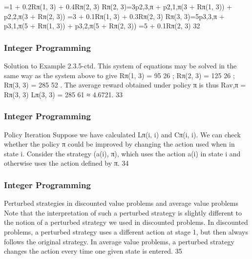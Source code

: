 \begin{frame}
=1 + 0.2Rπ(1, 3) + 0.4Rπ(2, 3)
Rπ(2, 3)=3p2,3,π + p2,1,π(3 + Rπ(1, 3)) + p2,2,π(3 + Rπ(2, 3))
=3 + 0.1Rπ(1, 3) + 0.3Rπ(2, 3)
Rπ(3, 3)=5p3,3,π + p3,1,π(5 + Rπ(1, 3)) + p3,2,π(5 + Rπ(2, 3))
=5 + 0.1Rπ(2, 3)
32 \end{frame}  \begin{frame} \frametitle{Integer Programming}     
Solution to Example 2.3.5-ctd.
This system of equations may be solved in the same way as the
system above to give
Rπ(1, 3) = 95
26
; Rπ(2, 3) = 125
26
; Rπ(3, 3) = 285
52
.
The average reward obtained under policy π is thus
Rav,π =
Rπ(3, 3)
Lπ(3, 3) =
285
61
≈ 4.6721.
33 \end{frame}  \begin{frame} \frametitle{Integer Programming}     
Policy Iteration
Suppose we have calculated Lπ(i, i) and Cπ(i, i).
We can check whether the policy π could be improved by changing
the action used when in state i.
Consider the strategy (a(i), π), which uses the action a(i) in state
i and otherwise uses the action defined by π.
34 \end{frame}  \begin{frame} \frametitle{Integer Programming}     
Perturbed strategies in discounted value problems and
average value problems
Note that the interpretation of such a perturbed strategy is slightly
different to the notion of a perturbed strategy we used in
discounted problems.
In discounted problems, a perturbed strategy uses a different
action at stage 1, but then always follows the original strategy.
In average value problems, a perturbed strategy changes the action
every time one given state is entered.
35 
\end{frame}  
